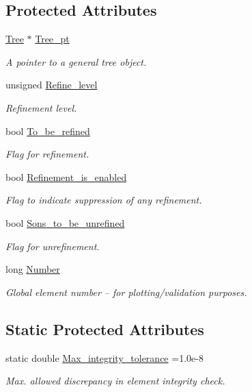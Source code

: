 \subsection*{Protected Attributes}
\begin{DoxyCompactItemize}
\item 
\hyperlink{classoomph_1_1Tree}{Tree} $\ast$ \hyperlink{classoomph_1_1RefineableElement_a465cd89744b63cf2aae72c8a73ad338d}{Tree\+\_\+pt}
\begin{DoxyCompactList}\small\item\em A pointer to a general tree object. \end{DoxyCompactList}\item 
unsigned \hyperlink{classoomph_1_1RefineableElement_a6ef0a3da577993977af94a37b48c4846}{Refine\+\_\+level}
\begin{DoxyCompactList}\small\item\em Refinement level. \end{DoxyCompactList}\item 
bool \hyperlink{classoomph_1_1RefineableElement_aa6c74962908602d1312760f2c9d9deb8}{To\+\_\+be\+\_\+refined}
\begin{DoxyCompactList}\small\item\em Flag for refinement. \end{DoxyCompactList}\item 
bool \hyperlink{classoomph_1_1RefineableElement_ae2349ec047d219be786ecdcb80389b1d}{Refinement\+\_\+is\+\_\+enabled}
\begin{DoxyCompactList}\small\item\em Flag to indicate suppression of any refinement. \end{DoxyCompactList}\item 
bool \hyperlink{classoomph_1_1RefineableElement_acda68ad98aed7385928a9c9d53b6f931}{Sons\+\_\+to\+\_\+be\+\_\+unrefined}
\begin{DoxyCompactList}\small\item\em Flag for unrefinement. \end{DoxyCompactList}\item 
long \hyperlink{classoomph_1_1RefineableElement_a8ad33274f3d7a65f8a633b9d9fa36a1d}{Number}
\begin{DoxyCompactList}\small\item\em Global element number -- for plotting/validation purposes. \end{DoxyCompactList}\end{DoxyCompactItemize}
\subsection*{Static Protected Attributes}
\begin{DoxyCompactItemize}
\item 
static double \hyperlink{classoomph_1_1RefineableElement_a24e8e8cbfd68f967386888f927d5432b}{Max\+\_\+integrity\+\_\+tolerance} =1.\+0e-\/8
\begin{DoxyCompactList}\small\item\em Max. allowed discrepancy in element integrity check. \end{DoxyCompactList}\end{DoxyCompactItemize}

